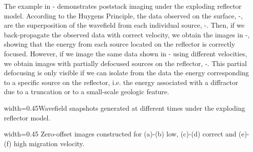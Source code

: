 The example in - demonstrates poststack imaging
under the exploding reflector model.  According to the Huygens
Principle, the data observed on the surface, -,
are the superposition of the wavefield from each individual source,
-. Then, if we back-propagate the
observed data with correct velocity, we obtain the images in
-, showing that the energy from each
source located on the reflector is correctly focused. However, if we
image the same data shown in - using different
velocities, we obtain images with partially defocused sources on the
reflector, -. This partial defocusing is
only visible if we can isolate from the data the energy corresponding
to a specific source on the reflector, i.e. the energy associated with
a diffractor due to a truncation or to a small-scale geologic feature.



{width=0.45\textwidth}{Wavefield snapshots generated at different
  times under the exploding reflector model.}

{width=0.45\textwidth} {Zero-offset images constructed for (a)-(b)
  low, (c)-(d) correct and (e)-(f) high migration velocity.}
